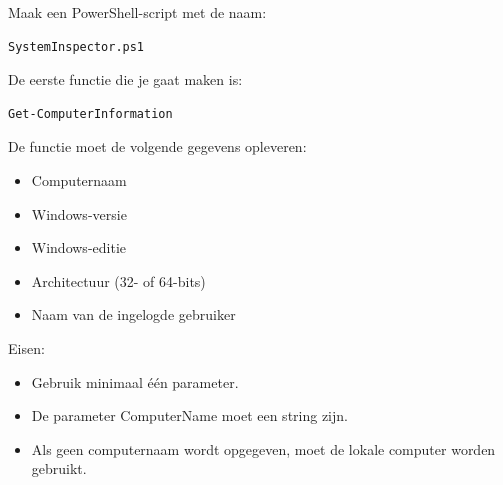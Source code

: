 Maak een PowerShell-script met de naam:
\begin{lstlisting}[language=bash]
SystemInspector.ps1
\end{lstlisting}

De eerste functie die je gaat maken is:
\begin{lstlisting}[language=bash]
Get-ComputerInformation
\end{lstlisting}

De functie moet de volgende gegevens opleveren:
\begin{itemize}
\item Computernaam
\item Windows-versie
\item Windows-editie
\item Architectuur (32- of 64-bits)
\item Naam van de ingelogde gebruiker
\end{itemize}

Eisen:
\begin{itemize}
\item Gebruik minimaal \'e\'en parameter.
\item De parameter ComputerName moet een string zijn.
\item Als geen computernaam wordt opgegeven, moet de lokale computer worden gebruikt.
\end{itemize}

